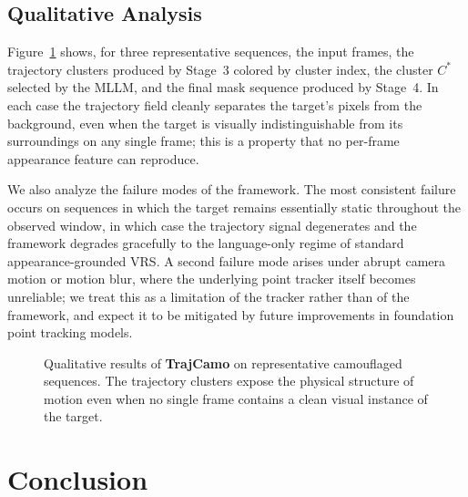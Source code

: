 \documentclass[11pt]{article}
\begin{document}
\subsection{Qualitative Analysis}

Figure~\ref{fig:qual} shows, for three representative sequences, the input frames, the trajectory clusters produced by Stage~3 colored by cluster index, the cluster $C^*$ selected by the MLLM, and the final mask sequence produced by Stage~4.
In each case the trajectory field cleanly separates the target's pixels from the background, even when the target is visually indistinguishable from its surroundings on any single frame; this is a property that no per-frame appearance feature can reproduce.

We also analyze the failure modes of the framework.
The most consistent failure occurs on sequences in which the target remains essentially static throughout the observed window, in which case the trajectory signal degenerates and the framework degrades gracefully to the language-only regime of standard appearance-grounded VRS.
A second failure mode arises under abrupt camera motion or motion blur, where the underlying point tracker itself becomes unreliable; we treat this as a limitation of the tracker rather than of the framework, and expect it to be mitigated by future improvements in foundation point tracking models.

\begin{figure}[t]
\centering
{}
\caption{Qualitative results of \textbf{TrajCamo} on representative camouflaged sequences. The trajectory clusters expose the physical structure of motion even when no single frame contains a clean visual instance of the target.}
\label{fig:qual}
\end{figure}



\section{Conclusion}
\end{document}
